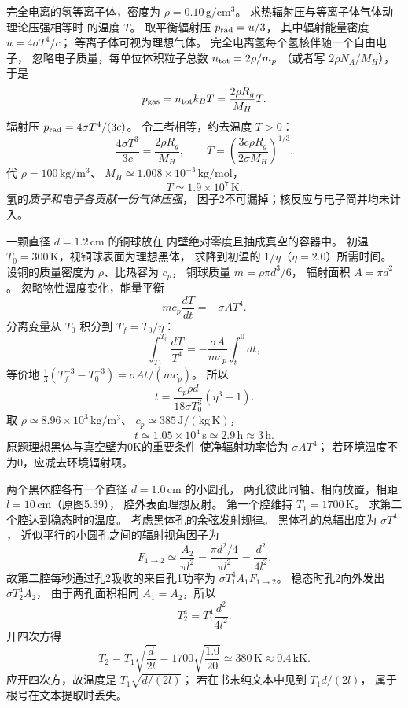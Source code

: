 完全电离的氢等离子体，密度为
$\rho=0.10\,\mathrm{g/cm^3}$。
求热辐射压与等离子体气体动理论压强相等时
的温度 $T$。
取平衡辐射压 $p_{\rm rad}=u/3$，
其中辐射能量密度 $u=4\sigma T^4/c$；
等离子体可视为理想气体。
\exsolution
完全电离氢每个氢核伴随一个自由电子，
忽略电子质量，每单位体积粒子总数
$n_{\rm tot}=2\rho/m_p$
（或者写 $2\rho N_A/M_H$），于是
\[
 p_{\rm gas}=n_{\rm tot}k_BT
 =\frac{2\rho R_g}{M_H}T.
\]
辐射压
$p_{\rm rad}=4\sigma T^4/(3c)$。
令二者相等，约去温度 $T>0$：
\[
 \frac{4\sigma T^3}{3c}
 =\frac{2\rho R_g}{M_H},
 \qquad
 \boxed{T=\left(
 \frac{3c\rho R_g}{2\sigma M_H}
 \right)^{1/3}}.
\]
代
$\rho=100\,\mathrm{kg/m^3}$、
$M_H\simeq1.008\times10^{-3}\,\mathrm{kg/mol}$，
\[
 \boxed{T\simeq1.9\times10^7\,\mathrm K}.
\]
\excheck 氢的\emph{质子和电子各贡献一份气体压强}，
因子2不可漏掉；核反应与电子简并均未计入。

一颗直径 $d=1.2\,\mathrm{cm}$ 的铜球放在
内壁绝对零度且抽成真空的容器中。
初温 $T_0=300\,\mathrm K$，视铜球表面为理想黑体，
求降到初温的 $1/\eta$（$\eta=2.0$）所需时间。
\exsolution
设铜的质量密度为 $\rho$、比热容为 $c_p$，
铜球质量
$m=\rho \pi d^3/6$，
辐射面积 $A=\pi d^2$。
忽略物性温度变化，能量平衡
\[
 mc_p\frac{dT}{dt}=-\sigma AT^4.
\]
分离变量从 $T_0$ 积分到
$T_f=T_0/\eta$：
\[
 \int_{T_f}^{T_0}\frac{dT}{T^4}
 =-\frac{\sigma A}{mc_p}\int_{t}^{0}\!dt,
\]
等价地
$\tfrac13(T_f^{-3}-T_0^{-3})
=\sigma At/(mc_p)$。
所以
\[
 \boxed{t=\frac{c_p\rho d}{18\sigma T_0^3}
 (\eta^3-1)}.
\]
取 $\rho\simeq8.96\times10^3\,\mathrm{kg/m^3}$、
$c_p\simeq385\,\mathrm{J/(kg\,K)}$，
\[
 \boxed{t\simeq1.05\times10^4\,\mathrm s
 \simeq2.9\,\mathrm h\approx3\,\mathrm h}.
\]
\excheck 原题理想黑体与真空壁为0K的重要条件
使净辐射功率恰为 $\sigma AT^4$；
若环境温度不为0，应减去环境辐射项。

两个黑体腔各有一个直径
$d=1.0\,\mathrm{cm}$ 的小圆孔，
两孔彼此同轴、相向放置，相距
$l=10\,\mathrm{cm}$（原图5.39），
腔外表面理想反射。
第一个腔维持
$T_1=1700\,\mathrm K$。
求第二个腔达到稳态时的温度。
考虑黑体孔的余弦发射规律。
\exsolution
黑体孔的总辐出度为 $\sigma T^4$，
近似平行的小圆孔之间的辐射视角因子为
\[
 F_{1\to2}\simeq\frac{A_2}{\pi l^2}
 =\frac{\pi d^2/4}{\pi l^2}
 =\frac{d^2}{4l^2}.
\]
故第二腔每秒通过孔2吸收的来自孔1功率为
$\sigma T_1^4 A_1 F_{1\to2}$。
稳态时孔2向外发出
$\sigma T_2^4 A_2$，
由于两孔面积相同 $A_1=A_2$，所以
\[
 T_2^4=T_1^4\frac{d^2}{4l^2}.
\]
开四次方得
\[
 \boxed{T_2=T_1\sqrt{\frac d{2l}}
 =1700\sqrt{\frac{1.0}{20}}
 \simeq380\,\mathrm K\approx0.4\,\mathrm{kK}}.
\]
\excheck 应开四次方，故温度是
$T_1\sqrt{d/(2l)}$；
若在书末纯文本中见到 $T_1d/(2l)$，
属于根号在文本提取时丢失。

